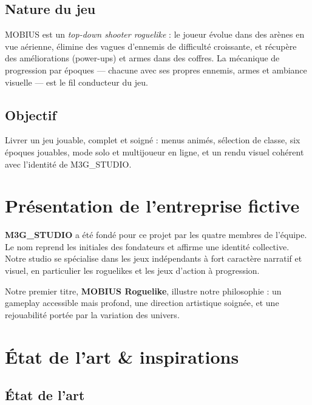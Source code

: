 \documentclass[12pt, a4paper]{report}
\begin{document}
\subsection{Nature du jeu}

MOBIUS est un \textit{top-down shooter roguelike} : le joueur \'{e}volue dans des ar\`{e}nes en vue a\'{e}rienne, \'{e}limine des vagues d'ennemis de difficult\'{e} croissante, et r\'{e}cup\`{e}re des am\'{e}liorations (power-ups) et armes dans des coffres. La m\'{e}canique de progression par \'{e}poques --- chacune avec ses propres ennemis, armes et ambiance visuelle --- est le fil conducteur du jeu.

\subsection{Objectif}

Livrer un jeu jouable, complet et soign\'{e} : menus anim\'{e}s, s\'{e}lection de classe, six \'{e}poques jouables, mode solo et multijoueur en ligne, et un rendu visuel coh\'{e}rent avec l'identit\'{e} de M3G\_STUDIO.

\section{Pr\'{e}sentation de l'entreprise fictive}

\textbf{M3G\_STUDIO} a \'{e}t\'{e} fond\'{e} pour ce projet par les quatre membres de l'\'{e}quipe. Le nom reprend les initiales des fondateurs et affirme une identit\'{e} collective. Notre studio se sp\'{e}cialise dans les jeux ind\'{e}pendants \`{a} fort caract\`{e}re narratif et visuel, en particulier les roguelikes et les jeux d'action \`{a} progression.

Notre premier titre, \textbf{MOBIUS Roguelike}, illustre notre philosophie : un gameplay accessible mais profond, une direction artistique soign\'{e}e, et une rejouabilit\'{e} port\'{e}e par la variation des univers.

\section{\'{E}tat de l'art \& inspirations}

\subsection{\'{E}tat de l'art}
\end{document}
